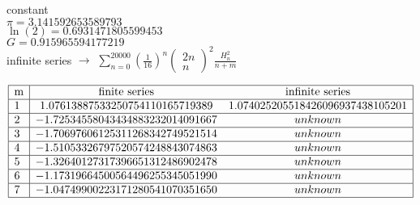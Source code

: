 \documentclass[12pt]{book}
\author{andersonwu2000}
\begin{document}
\begin{CJK}{UTF8}{bsmi}


constant \\
$\pi = 3.141592653589793$ \\
$\ln(2) = 0.6931471805599453$ \\
$G = 0.915965594177219$ \\

infinite series $\rightarrow$ $\displaystyle\sum_{n=0}^{20000}\left(\frac{1}{16}\right)^n\left(\begin{matrix}2n\\n\end{matrix}\right)^2\frac{H_n^2}{n+m}$

$$\begin{array}{|l|cc|}
\hline
\text{m} & 
\text{finite series} & 
\text{infinite series} \\
\hline 
1 &
1.07613887533250754110165719389 &
1.074025205518426096937438105201 \\
\hline 
2 &
-1.72534558043434883232014091667 &
unknown \\
\hline 
3 &
-1.70697606125311268342749521514 &
unknown \\
\hline 
4 &
-1.51053326797520574248843074863 &
unknown \\
\hline 
5 &
-1.32640127317396651312486902478 &
unknown \\
\hline 
6 &
-1.17319664500564496255345051990 &
unknown \\
\hline 
7 &
-1.04749900223171280541070351650 &
unknown \\
\hline 
\end{array}$$


\end{CJK}
\end{document}
